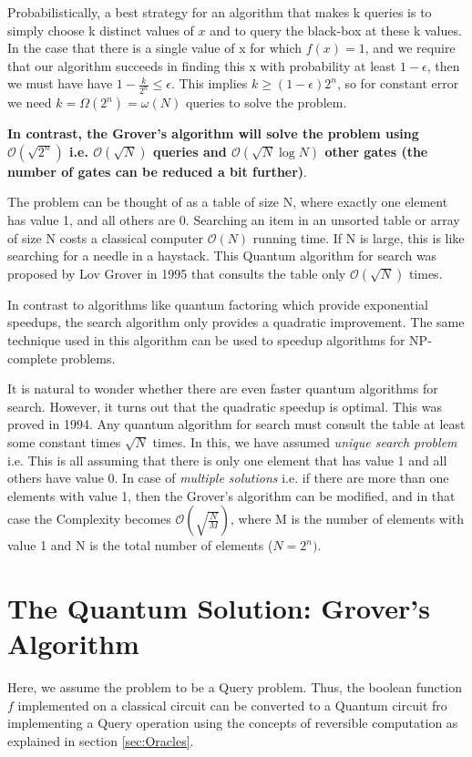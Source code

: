 \documentclass[12pt, oneside]{book}
\theoremstyle{definition}
\theoremstyle{definition}
\theoremstyle{remark}
\begin{document}
Probabilistically, a best strategy for an algorithm that makes k queries is to simply choose k distinct values of $x$ and to query the black-box at these k values. In the case that there is a single value of x for which $f(x)=1$, and we require that our algorithm succeeds in finding this x with probability at least $1-\epsilon$, then we must have have $1-\frac{k}{2^n}\leq \epsilon$. This implies $k\geq (1-\epsilon)2^n$, so for constant error we need $k=\Omega(2^n)=\omega(N)$ queries to solve the problem.

\textbf{In contrast, the Grover's algorithm will solve the problem using $\mathcal{O}(\sqrt{2^n})$ i.e. $\mathcal{O}(\sqrt{N})$ queries and $\mathcal{O}(\sqrt{N}\log N)$ other gates (the number of gates can be reduced a bit further)}.

\begin{importantnote}
    The problem can be thought of as a table of size N, where exactly one element has value 1, and all others are 0. Searching an item in an unsorted table or array of size N costs a classical computer $\mathcal{O}(N)$ running time. If N is large, this is like searching for a needle in a haystack. This Quantum algorithm for search was proposed by Lov Grover in 1995 that consults the table only $\mathcal{O}(\sqrt{N})$ times.

    In contrast to algorithms like quantum factoring which provide exponential speedups, the search algorithm only provides a quadratic improvement. The same technique used in this algorithm can be used to speedup algorithms for NP-complete problems.

    It is natural to wonder whether there are even faster quantum algorithms for search. However, it turns out that  the quadratic speedup is optimal. This was proved in 1994. Any quantum algorithm for search must consult the table at least some constant times $\sqrt{N}$ times. In this, we have assumed \textit{unique search problem} i.e. This is all assuming that there is only one element that has value 1 and all others have value 0. In case of \textit{multiple solutions} i.e. if there are more than one elements with value 1, then the Grover's algorithm can be modified, and in that case the Complexity becomes $\mathcal{O}(\sqrt{\frac{N}{M}})$, where M is the number of elements with value 1 and N is the total number of elements ($N=2^n)$.
\end{importantnote}
\section{The Quantum Solution: Grover's Algorithm}
Here, we assume the problem to be a Query problem. Thus, the boolean function $f$ implemented on a classical circuit can be converted to a Quantum circuit fro implementing a Query operation using the concepts of reversible computation as explained in section \ref{sec:Oracles}.
\end{document}
